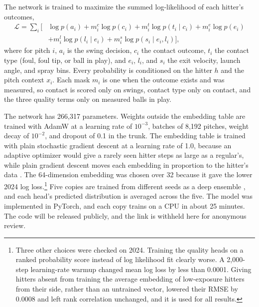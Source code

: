 \documentclass[11pt,letterpaper]{article}
\begin{document}
The network is trained to maximize the summed log-likelihood of each hitter's outcomes,
\begin{equation}
\begin{split}
\mathcal{L} = \sum_{i} \Big[ & \log p(a_i) + m^{c}_i \log p(c_i) + m^{t}_i \log p(t_i \mid c_i) + m^{e}_i \log p(e_i) \\
& + m^{l}_i \log p(l_i \mid e_i) + m^{s}_i \log p(s_i \mid e_i, l_i) \Big],
\end{split}
\label{eq:loss}
\end{equation}
where for pitch $i$, $a_i$ is the swing decision, $c_i$ the contact outcome, $t_i$ the contact type (foul, foul tip, or ball in play), and $e_i$, $l_i$, and $s_i$ the exit velocity, launch angle, and spray bins. Every probability is conditioned on the hitter $h$ and the pitch context $x_i$. Each mask $m_i$ is one when the outcome exists and was measured, so contact is scored only on swings, contact type only on contact, and the three quality terms only on measured balls in play.

The network has 266,317 parameters. Weights outside the embedding table are trained with AdamW \citep{loshchilov2019} at a learning rate of $10^{-3}$, batches of 8,192 pitches, weight decay of $10^{-2}$, and dropout of 0.1 in the trunk. The embedding table is trained with plain stochastic gradient descent at a learning rate of 1.0, because an adaptive optimizer would give a rarely seen hitter steps as large as a regular's, while plain gradient descent moves each embedding in proportion to the hitter's data \citep{stollenwerk2025}. The 64-dimension embedding was chosen over 32 because it gave the lower 2024 log loss.\footnote{Three other choices were checked on 2024. Training the quality heads on a ranked probability score instead of log likelihood fit clearly worse. A 2,000-step learning-rate warmup changed mean log loss by less than 0.0001. Giving hitters absent from training the average embedding of low-exposure hitters from their side, rather than an untrained vector, lowered their RMSE by 0.0008 and left rank correlation unchanged, and it is used for all results.} Five copies are trained from different seeds as a deep ensemble \citep{lakshminarayanan2017}, and each head's predicted distribution is averaged across the five. The model was implemented in PyTorch, and each copy trains on a CPU in about 25 minutes. The code will be released publicly, and the link is withheld here for anonymous review.
\end{document}
